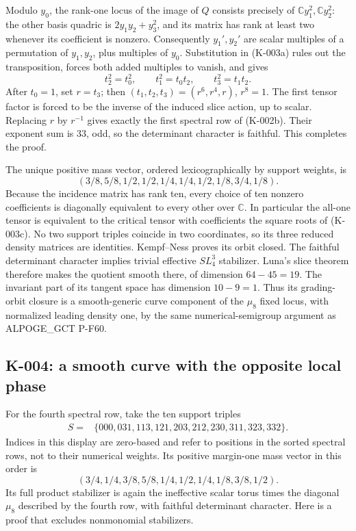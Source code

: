 Modulo $y_0$, the rank-one locus of the image of $Q$ consists precisely
of $\mathbb Cy_1^2,\mathbb Cy_2^2$: the other basis quadric is
$2y_1y_2+y_3^2$, and its matrix has rank at least two whenever its
coefficient is nonzero. Consequently $y_1',y_2'$ are scalar multiples
of a permutation of $y_1,y_2$, plus multiples of $y_0$.
Substitution in (K-003a) rules out the transposition, forces both
added multiples to vanish, and gives
\[
 t_2^2=t_0^2,\qquad t_1^2=t_0t_2,\qquad t_3^2=t_1t_2.
\]
After $t_0=1$, set $r=t_3$; then
$(t_1,t_2,t_3)=(r^6,r^4,r)$, $r^8=1$.
The first tensor factor is forced to be the inverse of the induced
slice action, up to scalar. Replacing $r$ by $r^{-1}$ gives exactly
the first spectral row of (K-002b). Their exponent sum is $33$, odd,
so the determinant character is faithful. This completes the proof.

The unique positive mass vector, ordered lexicographically by support
weights, is
\[
 (3/8,5/8,1/2,1/2,1/4,1/4,1/2,1/8,3/4,1/8).                  \tag{K-003c}
\]
Because the incidence matrix has rank ten, every choice of ten
nonzero coefficients is diagonally equivalent to every other over
$\mathbb C$. In particular the all-one tensor is equivalent to the
critical tensor with coefficients the square roots of (K-003c).
No two support triples coincide in two coordinates, so its three
reduced density matrices are identities. Kempf--Ness proves its
orbit closed. The faithful determinant character implies trivial
effective $SL_4^3$ stabilizer. Luna's slice theorem therefore makes
the quotient smooth there, of dimension $64-45=19$. The invariant
part of its tangent space has dimension $10-9=1$.
Thus its grading-orbit closure is a smooth-generic curve component
of the $\mu_8$ fixed locus, with normalized leading density one,
by the same numerical-semigroup argument as ALPOGE\_GCT P-F60.

\subsection{K-004: a smooth curve with the opposite local phase}
For the fourth spectral row, take the ten support triples
\[
\begin{split}
S={}&\{000,031,113,121,203,212,230,311,323,332\}.
\end{split}                                                    \tag{K-004a}
\]
Indices in this display are zero-based and refer to positions in
the sorted spectral rows, not to their numerical weights.
Its positive margin-one mass vector in this order is
\[
 (3/4,1/4,3/8,5/8,1/4,1/2,1/4,1/8,3/8,1/2).                 \tag{K-004b}
\]
Its full product stabilizer is again the ineffective scalar torus
times the diagonal $\mu_8$ described by the fourth row, with faithful
determinant character. Here is a proof that excludes nonmonomial
stabilizers.

